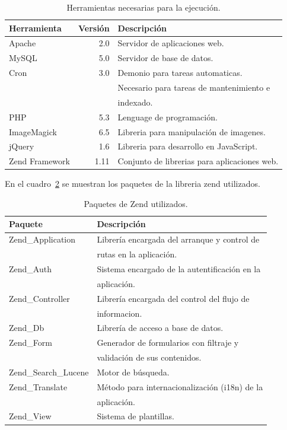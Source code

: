 \documentclass[letter,12pt]{article}
\begin{document}
\begin{table}
\begin{tabular}{l|r|l}
Herramienta    & Versión & Descripción                                  \\
\hline
Apache         &     2.0 & Servidor de aplicaciones web.                \\
MySQL          &     5.0 & Servidor de base de datos.                   \\
Cron           &     3.0 & Demonio para tareas automaticas.             \\
               &         & Necesario para tareas de mantenimiento e     \\
               &         & indexado.                                    \\
PHP            &     5.3 & Lenguage de programación.                    \\
ImageMagick    &     6.5 & Libreria para manipulación de imagenes.      \\
jQuery         &     1.6 & Libreria para desarrollo en JavaScript.      \\
Zend Framework &    1.11 & Conjunto de librerias para aplicaciones web. \\
\end{tabular}
\caption{Herramientas necesarias para la ejecución.}
\label{herramientas_despliegue}
\end{table}

En el cuadro~\ref{herramientas_zend} se muestran los paquetes de la libreria zend utilizados.

\begin{table}
\begin{tabular}{l|l}
Paquete & Descripción \\
\hline
Zend\_Application     & Librería encargada del arranque y control de    \\
					  & rutas en la aplicación. \\
Zend\_Auth            & Sistema encargado de la autentificación en la   \\
					  & aplicación. \\
Zend\_Controller      & Librería encargada del control del flujo de     \\
				      & informacion. \\
Zend\_Db              & Librería de acceso a base de datos. \\
Zend\_Form            & Generador de formularios con filtraje y         \\
					  & validación de sus contenidos. \\
Zend\_Search\_Lucene  & Motor de búsqueda. \\
Zend\_Translate       & Método para internacionalización (i18n) de la   \\
				      & aplicación. \\
Zend\_View            & Sistema de plantillas. \\
\end{tabular}
\caption{Paquetes de Zend utilizados.}
\label{herramientas_zend}
\end{table}
\end{document}

